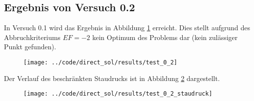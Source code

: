 \subsection{Ergebnis von Versuch 0.2}\label{kap:Versuch02}
In Versuch 0.1 wird das Ergebnis in Abbildung \ref{img:test_0_2} erreicht. Dies stellt aufgrund des Abbruchkriteriums $EF = -2$ kein Optimum des Problems dar (kein zulässiger Punkt gefunden).
\begin{figure}[H]
\begin{center}
\texttt{[image: ../code/direct\_sol/results/test\_0\_2]}
 \label{img:test_0_2}
\end{center}
\end{figure}
Der Verlauf des beschränkten Staudrucks ist in Abbildung \ref{img:test_0_2_staudruck} dargestellt.
\begin{figure}[H]
\begin{center}
\texttt{[image: ../code/direct\_sol/results/test\_0\_2\_staudruck]}
 \label{img:test_0_2_staudruck}
\end{center}
\end{figure}











\newpage
